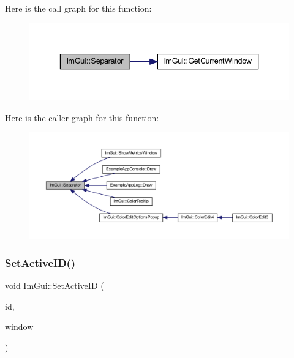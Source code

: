 Here is the call graph for this function\+:
\nopagebreak
\begin{figure}[H]
\begin{center}
\leavevmode
\includegraphics[width=336pt]{namespace_im_gui_a191123597a5084d003c8beac7eeb029e_cgraph}
\end{center}
\end{figure}
Here is the caller graph for this function\+:
\nopagebreak
\begin{figure}[H]
\begin{center}
\leavevmode
\includegraphics[width=350pt]{namespace_im_gui_a191123597a5084d003c8beac7eeb029e_icgraph}
\end{center}
\end{figure}
\mbox{\label{namespace_im_gui_a27b8ace13a8c421ee8405f0cbebe4ead}} 
\subsubsection{\texorpdfstring{Set\+Active\+I\+D()}{SetActiveID()}}
{\footnotesize\ttfamily void Im\+Gui\+::\+Set\+Active\+ID (\begin{DoxyParamCaption}\item[{\mbox{\hyperlink{imgui_8h_a1785c9b6f4e16406764a85f32582236f}{Im\+Gui\+ID}}}]{id,  }\item[{\mbox{\hyperlink{struct_im_gui_window}{Im\+Gui\+Window}} $\ast$}]{window }\end{DoxyParamCaption})}

